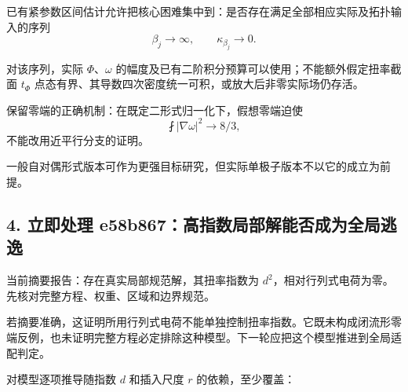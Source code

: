 \documentclass[
  10pt,
]{article}
\begin{document}
已有紧参数区间估计允许把核心困难集中到：是否存在满足全部相应实际及拓扑输入的序列
\[
\beta_j\longrightarrow\infty,\qquad \kappa_{\beta_j}\longrightarrow0.
\]

对该序列，实际 \(\Phi\)、\(\omega\)
的幅度及已有二阶积分预算可以使用；不能额外假定扭率截面 \(t_\Phi\)
点态有界、其导数四次密度统一可积，或放大后非零实际场仍存活。

保留零端的正确机制：在既定二形式归一化下，假想零端迫使 \[
\fint|\nabla\omega|^2\to8/3,
\] 不能改用近平行分支的证明。

一般自对偶形式版本可作为更强目标研究，但实际单极子版本不以它的成立为前提。

\hypertarget{ux7acbux5373ux5904ux7406-e58b867ux9ad8ux6307ux6570ux5c40ux90e8ux89e3ux80fdux5426ux6210ux4e3aux5168ux5c40ux9003ux9038}{%
\subsection{4. 立即处理
e58b867：高指数局部解能否成为全局逃逸}\label{ux7acbux5373ux5904ux7406-e58b867ux9ad8ux6307ux6570ux5c40ux90e8ux89e3ux80fdux5426ux6210ux4e3aux5168ux5c40ux9003ux9038}}

当前摘要报告：存在真实局部规范解，其扭率指数为
\(d^2\)，相对行列式电荷为零。先核对完整方程、权重、区域和边界规范。

若摘要准确，这证明所用行列式电荷不能单独控制扭率指数。它既未构成闭流形零端反例，也未证明完整方程必定排除这种模型。下一轮应把这个模型推进到全局适配判定。

对模型逐项推导随指数 \(d\) 和插入尺度 \(r\) 的依赖，至少覆盖：
\end{document}
